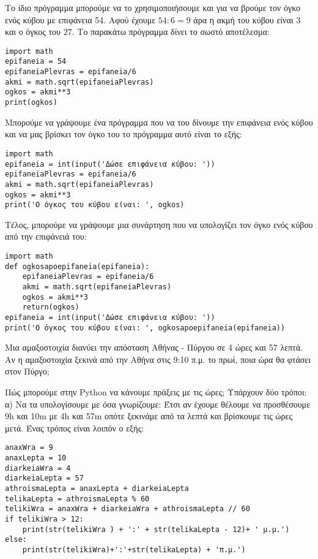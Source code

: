 Το ίδιο πρόγραμμα μπορούμε να το χρησιμοποιήσουμε και για να βρούμε τον όγκο ενός κύβου με επιφάνεια 54. Αφού έχουμε
$54:6=9$ άρα η ακμή του κύβου είναι $3$ και ο όγκος του $27$. Το παρακάτω πρόγραμμα δίνει το σωστό αποτέλεσμα:
\begin{lstlisting}
import math
epifaneia = 54
epifaneiaPlevras = epifaneia/6
akmi = math.sqrt(epifaneiaPlevras)
ogkos = akmi**3
print(ogkos)
\end{lstlisting}

Μπορούμε να γράψουμε ένα πρόγραμμα που να του δίνουμε την επιφάνεια ενός κύβου και να μας βρίσκει τον όγκο του το πρόγραμμα αυτό είναι το εξής:
\begin{lstlisting}
import math
epifaneia = int(input('Δώσε επιφάνεια κύβου: '))
epifaneiaPlevras = epifaneia/6
akmi = math.sqrt(epifaneiaPlevras)
ogkos = akmi**3
print('Ο όγκος του κύβου είναι: ', ogkos)
\end{lstlisting}

Τέλος, μπορούμε να γράψουμε μια συνάρτηση που να υπολογίζει τον όγκο ενός κύβου από την επιφάνειά του:
\begin{lstlisting}
import math
def ogkosapoepifaneia(epifaneia):
    epifaneiaPlevras = epifaneia/6
    akmi = math.sqrt(epifaneiaPlevras)
    ogkos = akmi**3
    return(ogkos)
epifaneia = int(input('Δώσε επιφάνεια κύβου: '))
print('Ο όγκος του κύβου είναι: ', ogkosapoepifaneia(epifaneia))
\end{lstlisting}
    
 

\begin{exercise}
Mια αμαξοστοιχία διανύει την απόσταση Αθήνας -
Πύργου σε 4 ώρες και 57 λεπτά.
Αν η αμαξοστοιχία ξεκινά από την Αθήνα στις 9:10
π.μ. το πρωί, ποια ώρα θα φτάσει στον Πύργο;
\end{exercise}
Πώς μπορούμε στην Python να κάνουμε πράξεις με τις ώρες;  Υπάρχουν δύο τρόποι:
α)
Να τα υπολογίσουμε με όσα γνωρίζουμε:
Έτσι αν έχουμε θέλουμε να προσθέσουμε 9h και 10m με 4h και 57m οπότε ξεκινάμε από τα λεπτά και βρίσκουμε τις ώρες μετά. Ένας τρόπος είναι λοιπόν ο εξής:
\begin{lstlisting}
anaxWra = 9
anaxLepta = 10
diarkeiaWra = 4
diarkeiaLepta = 57
athroismaLepta = anaxLepta + diarkeiaLepta
telikaLepta = athroismaLepta % 60
telikiWra = anaxWra + diarkeiaWra + athroismaLepta // 60
if telikiWra > 12:
    print(str(telikiWra ) + ':' + str(telikaLepta - 12)+ ' μ.μ.')
else:
    print(str(telikiWra)+':'+str(telikaLepta) + 'π.μ.')
\end{lstlisting}

